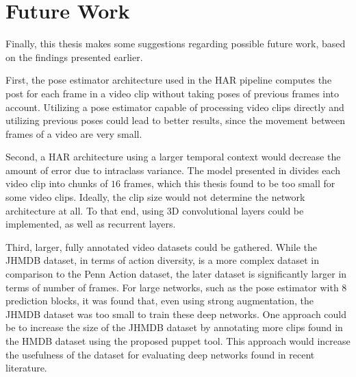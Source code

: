 \section{Future Work}
Finally, this thesis makes some suggestions regarding possible future work, based on the findings presented earlier.

First, the pose estimator architecture used in the HAR pipeline computes the post for each frame in a video clip without taking poses of previous frames into account.
Utilizing a pose estimator capable of processing video clips directly and utilizing previous poses could lead to better results, since the movement between frames of a video are very small.

Second, a HAR architecture using a larger temporal context would decrease the amount of error due to intraclass variance.
The model presented in \cite{luvizon_2d/3d_2018} divides each video clip into chunks of $16$ frames, which this thesis found to be too small for some video clips.
Ideally, the clip size would not determine the network architecture at all.
To that end, using 3D convolutional layers could be implemented, as well as recurrent layers.

Third, larger, fully annotated video datasets could be gathered.
While the JHMDB dataset, in terms of action diversity, is a more complex dataset in comparison to the Penn Action dataset, the later dataset is significantly larger in terms of number of frames.
For large networks, such as the pose estimator with $8$ prediction blocks, it was found that, even using strong augmentation, the JHMDB dataset was too small to train these deep networks.
One approach could be to increase the size of the JHMDB dataset by annotating more clips found in the HMDB dataset using the proposed puppet tool.
This approach would increase the usefulness of the dataset for evaluating deep networks found in recent literature.
